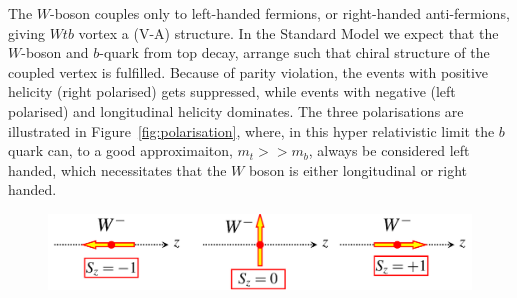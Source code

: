 \documentclass[12pt,a4paper]{article}
\numberwithin{equation}{section}
\begin{document}
The $W$-boson couples only to left-handed fermions, or right-handed
anti-fermions, giving $Wtb$ vortex a (V-A) structure. In the Standard Model we
expect that the $W$-boson and $b$-quark from top decay, arrange such that chiral
structure of the coupled vertex is fulfilled. Because of parity violation, the
events with positive helicity (right polarised) gets suppressed, while events
with negative (left polarised) and longitudinal helicity dominates. The three
polarisations are illustrated in Figure~\ref{fig:polarisation}, where, in this
hyper relativistic limit the $b$ quark can, to a good approximaiton,
$m_t >> m_b$, always be considered left handed, which necessitates that the $W$
boson is either longitudinal or right handed.

\begin{figure}[H]
  \includegraphics[width=\linewidth]{figures/w_polarization.png}
  \begin{tikzpicture}

\end{tikzpicture}
\end{figure}
\end{document}
